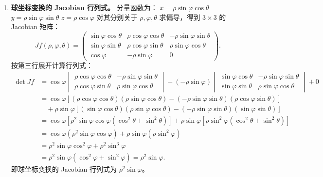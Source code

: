 \documentclass[lang=cn,11pt]{elegantbook}
\begin{document}
\begin{solution}
\begin{enumerate}
  \item[(2)] \textbf{球坐标变换的 Jacobian 行列式。}
  分量函数为：
  $x = \rho\sin\varphi\cos\theta$
  $y = \rho\sin\varphi\sin\theta$
  $z = \rho\cos\varphi$
  对其分别关于 $\rho, \varphi, \theta$ 求偏导，得到 $3 \times 3$ 的 Jacobian 矩阵：
  \[
  Jf(\rho,\varphi,\theta) = \begin{pmatrix}
  \sin\varphi\cos\theta & \rho\cos\varphi\cos\theta & -\rho\sin\varphi\sin\theta \\
  \sin\varphi\sin\theta & \rho\cos\varphi\sin\theta & \rho\sin\varphi\cos\theta \\
  \cos\varphi & -\rho\sin\varphi & 0
  \end{pmatrix}.
  \]
  按第三行展开计算行列式：
  \[
  \begin{aligned}
  \det Jf &= \cos\varphi \begin{vmatrix} \rho\cos\varphi\cos\theta & -\rho\sin\varphi\sin\theta \\ \rho\cos\varphi\sin\theta & \rho\sin\varphi\cos\theta \end{vmatrix}
  - (-\rho\sin\varphi) \begin{vmatrix} \sin\varphi\cos\theta & -\rho\sin\varphi\sin\theta \\ \sin\varphi\sin\theta & \rho\sin\varphi\cos\theta \end{vmatrix} + 0 \\
  &= \cos\varphi \left[ (\rho\cos\varphi\cos\theta)(\rho\sin\varphi\cos\theta) - (-\rho\sin\varphi\sin\theta)(\rho\cos\varphi\sin\theta) \right] \\
  &\quad + \rho\sin\varphi \left[ (\sin\varphi\cos\theta)(\rho\sin\varphi\cos\theta) - (-\rho\sin\varphi\sin\theta)(\sin\varphi\sin\theta) \right] \\
  &= \cos\varphi \left[ \rho^2\sin\varphi\cos\varphi(\cos^2\theta + \sin^2\theta) \right] + \rho\sin\varphi \left[ \rho\sin^2\varphi(\cos^2\theta + \sin^2\theta) \right] \\
  &= \cos\varphi (\rho^2\sin\varphi\cos\varphi) + \rho\sin\varphi (\rho\sin^2\varphi) \\
  &= \rho^2\sin\varphi\cos^2\varphi + \rho^2\sin^3\varphi \\
  &= \rho^2\sin\varphi(\cos^2\varphi + \sin^2\varphi) = \rho^2\sin\varphi.
  \end{aligned}
  \]
  即球坐标变换的 Jacobian 行列式为 $\rho^2\sin\varphi$。
\end{enumerate}
\end{solution}
\end{document}
